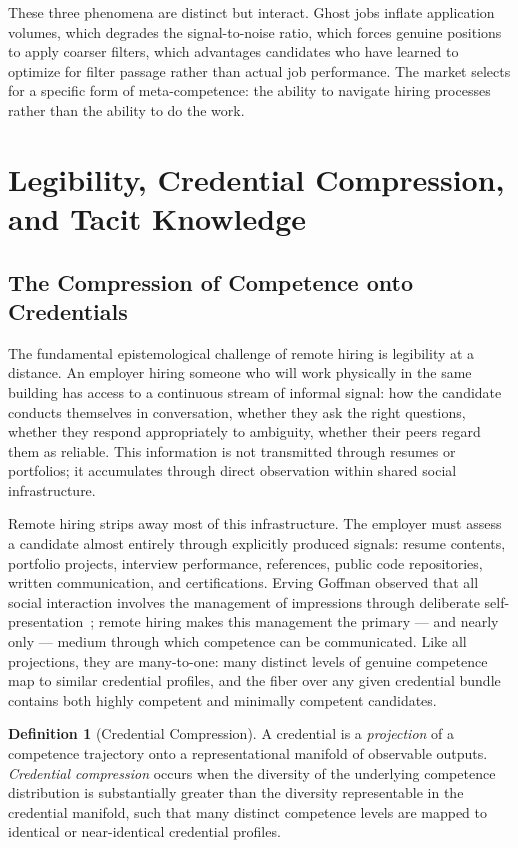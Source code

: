 \documentclass[12pt, a4paper]{article}
\theoremstyle{plain}
\theoremstyle{definition}
\newtheorem{definition}[proposition]{Definition}
\theoremstyle{remark}
\begin{document}
These three phenomena are distinct but interact.
Ghost jobs inflate application volumes, which degrades the signal-to-noise ratio,
which forces genuine positions to apply coarser filters,
which advantages candidates who have learned to optimize for filter passage
rather than actual job performance.
The market selects for a specific form of meta-competence:
the ability to navigate hiring processes rather than the ability to do the work.

\section{Legibility, Credential Compression, and Tacit Knowledge}
\label{sec:legibility}

\subsection{The Compression of Competence onto Credentials}

The fundamental epistemological challenge of remote hiring is legibility at a distance.
An employer hiring someone who will work physically in the same building
has access to a continuous stream of informal signal: how the candidate conducts
themselves in conversation, whether they ask the right questions,
whether they respond appropriately to ambiguity, whether their peers regard them as reliable.
This information is not transmitted through resumes or portfolios;
it accumulates through direct observation within shared social infrastructure.

Remote hiring strips away most of this infrastructure.
The employer must assess a candidate almost entirely through explicitly produced signals:
resume contents, portfolio projects, interview performance, references,
public code repositories, written communication, and certifications.
Erving Goffman observed that all social interaction involves the management
of impressions through deliberate self-presentation~\cite{goffman1959};
remote hiring makes this management the primary --- and nearly only --- medium
through which competence can be communicated.
Like all projections, they are many-to-one: many distinct levels of genuine competence
map to similar credential profiles, and the fiber over any given credential bundle
contains both highly competent and minimally competent candidates.

\begin{definition}[Credential Compression]
A credential is a \emph{projection} of a competence trajectory onto a
representational manifold of observable outputs.
\emph{Credential compression} occurs when the diversity of the underlying
competence distribution is substantially greater than the diversity
representable in the credential manifold,
such that many distinct competence levels are mapped to identical or
near-identical credential profiles.
\end{definition}
\end{document}
